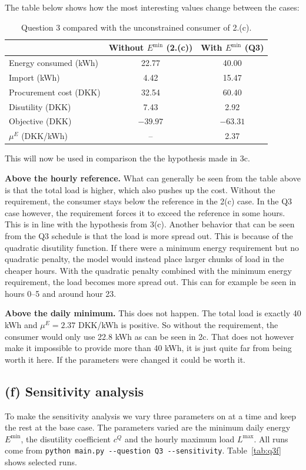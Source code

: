 The table below shows how the most interesting values change between the cases: 
\begin{table}[H]
\centering
\begin{tabular}{lcc}
\toprule
 & Without $E^{\min}$ (2.(c)) & With $E^{\min}$ (Q3) \\
\midrule
Energy consumed (kWh)   & 22.77     & 40.00     \\
Import (kWh)            & 4.42      & 15.47     \\
Procurement cost (DKK)  & 32.54     & 60.40     \\
Disutility (DKK)        & 7.43      & 2.92      \\
Objective (DKK)         & $-39.97$  & $-63.31$  \\
$\mu^E$ (DKK/kWh)       & --        & 2.37      \\
\bottomrule
\end{tabular}
\caption{Question 3 compared with the unconstrained consumer of 2.(c).}
\label{tab:q3e}
\end{table}


This will now be used in comparison the the hypothesis made in 3c.

\textbf{Above the hourly reference.} What can generally be seen from the table above is that the total load is higher, which also pushes up the cost. Without the requirement, the consumer stays below the reference in the 2(c) case. In the Q3 case however, the requirement forces it to exceed the reference in some hours. This is in line with the hypothesis from 3(c). Another behavior that can be seen from the Q3 schedule is that the load is more spread out. This is because of the quadratic disutility function. If there were a minimum energy requirement but no quadratic penalty, the model would instead place larger chunks of load in the cheaper hours. With the quadratic penalty combined with the minimum energy requirement, the load becomes more spread out. This can for example be seen in hours 0--5 and around hour 23.

\textbf{Above the daily minimum.} This does not happen. The total load is exactly 40 kWh and $\mu^E = 2.37$ DKK/kWh is positive. So without the requirement, the consumer would only use 22.8 kWh as can be seen in 2c. That does not however make it impossible to provide more than 40 kWh, it is just quite far from being worth it here. If the parameters were changed it could be worth it.

\subsection{(f) Sensitivity analysis}
To make the sensitivity analysis we vary three parameters on at a time and keep the rest at the base case. The parameters varied are the minimum daily energy $E^{\min}$, the disutility coefficient $c^Q$ and the hourly maximum load $L^{\max}$. All runs come from \texttt{python main.py -{}-question Q3 -{}-sensitivity}.
Table~\ref{tab:q3f} shows selected runs.

